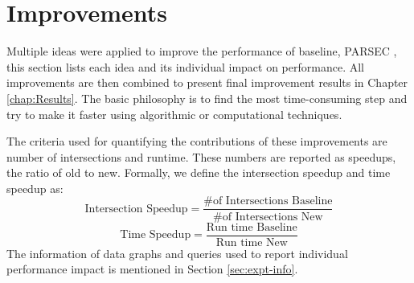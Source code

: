 \chapter{Improvements}{\label{chap:Improvements}
Multiple ideas were applied to improve the performance of baseline, PARSEC \cite{PARSEC_VD}, this section lists each idea and its individual impact on performance.
All improvements are then combined to present final improvement results in Chapter \ref{chap:Results}.
The basic philosophy is to find the most time-consuming step and try to make it faster using algorithmic or computational techniques.

The criteria used for quantifying the contributions of these improvements are number of intersections and runtime.
These numbers are reported as speedups, the ratio of old to new.
Formally, we define the intersection speedup and time speedup as:
$$
    \text{Intersection Speedup} = \frac{\text{\# of Intersections Baseline}}{\text{\# of Intersections New}}
$$
$$
    \text{Time Speedup} = \frac{\text{Run time Baseline}}{\text{Run time New}}
$$
The information of data graphs and queries used to report individual performance impact is mentioned in Section \ref{sec:expt-info}.

}
